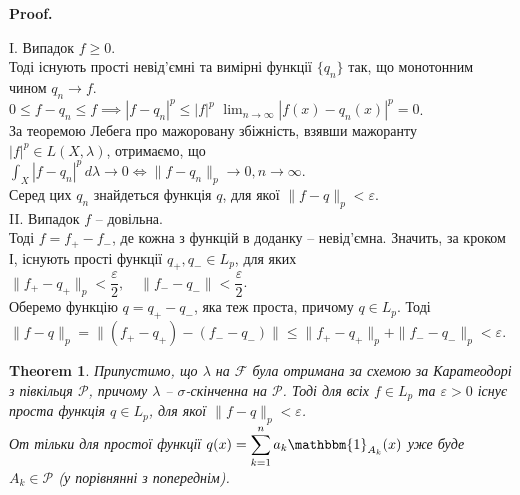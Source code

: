 \documentclass[a4paper, 10pt]{article}
\makeatletter
\theoremstyle{theoremdd}
\newtheorem{theorem}{Theorem}[subsection]
\renewenvironment{proof}[1][Proof.\\]{\par
\pushQED{\hfill \qed}%
\normalfont \topsep6\p@\@plus6\p@\relax
\trivlist
\item\relax
{\bfseries
#1\@addpunct{.}}\hspace\labelsep\ignorespaces
}{%
\popQED\endtrivlist\@endpefalse
}
\makeatother
\begin{document}
\begin{proof}
I. Випадок $f \geq 0$.\\
Тоді існують прості невід'ємні та вимірні функції $\{q_n\}$ так, що монотонним чином $q_n \to f$.\\
$0 \leq f - q_n \leq f \implies |f-q_n|^p \leq |f|^p$ \qquad $\displaystyle\lim_{n \to \infty} |f(x) - q_n(x)|^p = 0$.\\
За теоремою Лебега про мажоровану збіжність, взявши мажоранту $|f|^p \in L(X,\lambda)$, отримаємо, що\\
$\displaystyle\int_X |f-q_n|^p\,d\lambda \to 0 \iff \|f-q_n\|_p \to 0, n \to \infty$.\\
Серед цих $q_n$ знайдеться функція $q$, для якої $\|f-q\|_p < \varepsilon$.
\bigskip \\
II. Випадок $f$ -- довільна.\\
Тоді $f = f_+ - f_-$, де кожна з функцій в доданку -- невід'ємна. Значить, за кроком І, існують прості функції $q_+,q_- \in L_p$, для яких $\|f_+ - q_+\|_p < \dfrac{\varepsilon}{2}, \quad \|f_- - q_-\| < \dfrac{\varepsilon}{2}$.\\
Оберемо функцію $q = q_+ - q_-$, яка теж проста, причому $q \in L_p$. Тоді\\
$\|f-q\|_p = \| (f_+ - q_+) - (f_- - q_-)\| \leq \|f_+-q_+\|_p + \|f_- - q_-\|_p < \varepsilon$.
\end{proof}

\begin{theorem}
Припустимо, що $\lambda$ на $\mathcal{F}$ була отримана за схемою за Каратеодорі з півкільця $\mathcal{P}$, причому $\lambda$ -- $\sigma$-скінченна на $\mathcal{P}$. Тоді для всіх $f \in L_p$ та $\varepsilon >0$ існує проста функція $q \in L_p$, для якої $\|f-q\|_p < \varepsilon$.\\
От тільки для простої функції $q(x) = \displaystyle\sum_{k=1}^n a_k \mathbbm{1}_{A_k}(x)$ уже буде $A_k \in \mathcal{P}$ (у порівнянні з попереднім).
\end{theorem}
\end{document}

